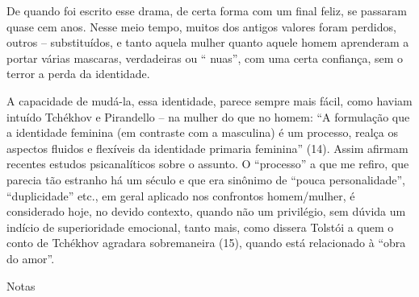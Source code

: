 De quando foi escrito esse drama, de certa forma com um final feliz, se
passaram quase cem anos. Nesse meio tempo, muitos dos antigos valores
foram perdidos, outros -- substituídos, e tanto aquela mulher quanto
aquele homem aprenderam a portar várias mascaras, verdadeiras ou ``
nuas'', com uma certa confiança, sem o terror a perda da identidade.

A capacidade de mudá-la, essa identidade, parece sempre mais fácil, como
haviam intuído Tchékhov e Pirandello -- na mulher do que no homem: ``A
formulação que a identidade feminina (em contraste com a masculina) é um
processo, realça os aspectos fluidos e flexíveis da identidade primaria
feminina'' (14). Assim afirmam recentes estudos psicanalíticos sobre o
assunto. O ``processo'' a que me refiro, que parecia tão estranho há um
século e que era sinônimo de ``pouca personalidade'', ``duplicidade''
etc., em geral aplicado nos confrontos homem/mulher, é considerado hoje,
no devido contexto, quando não um privilégio, sem dúvida um indício de
superioridade emocional, tanto mais, como dissera Tolstói a quem o conto
de Tchékhov agradara sobremaneira (15), quando está relacionado à ``obra
do amor''.

Notas

